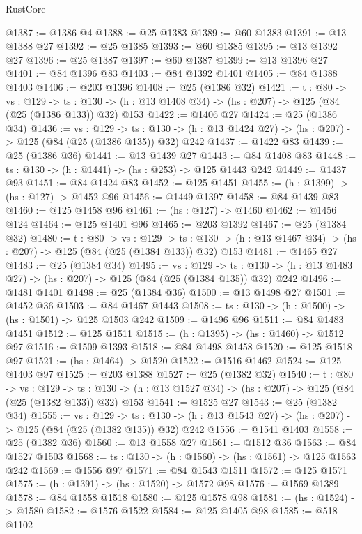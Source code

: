 \begin{lexlean}{RustCore}
\begin{coremodule}
@1387 := @1386 @4
@1388 := @25 @1383
@1389 := @60 @1383
@1391 := @13 @1388 @27
@1392 := @25 @1385
@1393 := @60 @1385
@1395 := @13 @1392 @27
@1396 := @25 @1387
@1397 := @60 @1387
@1399 := @13 @1396 @27
@1401 := @84 @1396 @83
@1403 := @84 @1392 @1401
@1405 := @84 @1388 @1403
@1406 := @203 @1396
@1408 := @25 (@1386 @32)
@1421 := {t : @80} ->
  {vs : @129} ->
  {ts : @130} -> (h : @13 @1408 @34) -> (hs : @207) -> @125 (@84 (@25 (@1386 @133)) @32) @153
@1422 := @1406 @27
@1424 := @25 (@1386 @34)
@1436 := {vs : @129} ->
  {ts : @130} -> (h : @13 @1424 @27) -> (hs : @207) -> @125 (@84 (@25 (@1386 @135)) @32) @242
@1437 := @1422 @83
@1439 := @25 (@1386 @36)
@1441 := @13 @1439 @27
@1443 := @84 @1408 @83
@1448 := {ts : @130} -> (h : @1441) -> (hs : @253) -> @125 @1443 @242
@1449 := @1437 @93
@1451 := @84 @1424 @83
@1452 := @125 @1451
@1455 := (h : @1399) -> (hs : @127) -> @1452 @96
@1456 := @1449 @1397
@1458 := @84 @1439 @83
@1460 := @125 @1458 @96
@1461 := (hs : @127) -> @1460
@1462 := @1456 @124
@1464 := @125 @1401 @96
@1465 := @203 @1392
@1467 := @25 (@1384 @32)
@1480 := {t : @80} ->
  {vs : @129} ->
  {ts : @130} -> (h : @13 @1467 @34) -> (hs : @207) -> @125 (@84 (@25 (@1384 @133)) @32) @153
@1481 := @1465 @27
@1483 := @25 (@1384 @34)
@1495 := {vs : @129} ->
  {ts : @130} -> (h : @13 @1483 @27) -> (hs : @207) -> @125 (@84 (@25 (@1384 @135)) @32) @242
@1496 := @1481 @1401
@1498 := @25 (@1384 @36)
@1500 := @13 @1498 @27
@1501 := @1452 @36
@1503 := @84 @1467 @1443
@1508 := {ts : @130} -> (h : @1500) -> (hs : @1501) -> @125 @1503 @242
@1509 := @1496 @96
@1511 := @84 @1483 @1451
@1512 := @125 @1511
@1515 := (h : @1395) -> (hs : @1460) -> @1512 @97
@1516 := @1509 @1393
@1518 := @84 @1498 @1458
@1520 := @125 @1518 @97
@1521 := (hs : @1464) -> @1520
@1522 := @1516 @1462
@1524 := @125 @1403 @97
@1525 := @203 @1388
@1527 := @25 (@1382 @32)
@1540 := {t : @80} ->
  {vs : @129} ->
  {ts : @130} -> (h : @13 @1527 @34) -> (hs : @207) -> @125 (@84 (@25 (@1382 @133)) @32) @153
@1541 := @1525 @27
@1543 := @25 (@1382 @34)
@1555 := {vs : @129} ->
  {ts : @130} -> (h : @13 @1543 @27) -> (hs : @207) -> @125 (@84 (@25 (@1382 @135)) @32) @242
@1556 := @1541 @1403
@1558 := @25 (@1382 @36)
@1560 := @13 @1558 @27
@1561 := @1512 @36
@1563 := @84 @1527 @1503
@1568 := {ts : @130} -> (h : @1560) -> (hs : @1561) -> @125 @1563 @242
@1569 := @1556 @97
@1571 := @84 @1543 @1511
@1572 := @125 @1571
@1575 := (h : @1391) -> (hs : @1520) -> @1572 @98
@1576 := @1569 @1389
@1578 := @84 @1558 @1518
@1580 := @125 @1578 @98
@1581 := (hs : @1524) -> @1580
@1582 := @1576 @1522
@1584 := @125 @1405 @98
@1585 := @518 @1102

\end{coremodule}
\end{lexlean}
